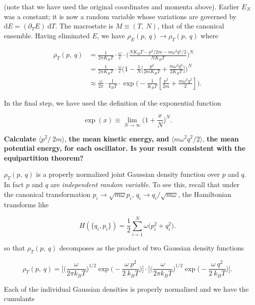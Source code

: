 \documentclass[11pt]{article}
\begin{document}
(note that we have used the original coordinates and momenta above). Earlier \(E_{N}\) was a constant; it is now a random variable whose variations are governed by \(\mathrm{d}E = (\partial_{T} E)~\mathrm{d} T\). The macrostate is \(M \equiv (T,~N)\), that of the canonical ensemble. Having eliminated \(E\), we have \(\rho_{E}(p,~q) \to \rho_{T}(p,~q)\) where

\begin{align*}
\rho_{T} (p,~q) & =\frac{1}{2 \pi K_{B} T} \cdot \frac{\omega}{e} \cdot\bigg(\frac{N K_{B} T-p^{2} / 2 m-m \omega^{2} q^{2} / 2}{N K_{B} T}\bigg)^{N} \\
& =\frac{1}{2 \pi K_{B} T} \cdot \frac{\omega}{e}\bigg(1-\frac{1}{N}\bigg[\frac{p^{2}}{2 m K_{B} T}+\frac{m \omega^{2} q^{2} }{2 K_{B} T}\bigg]\bigg)^{N} \\
& \approx \frac{\omega}{2 \pi} \cdot \frac{1}{k_{B} T} \cdot \exp \bigg(-\frac{1}{K_{B} T}\left[\frac{p^{2}}{2 m}+\frac{m \omega^{2} q^{2} }{2}\right]\bigg).
\end{align*}

In the final step, we have used the definition of the exponential function

\[
\exp(x) \equiv \lim_{N \to \infty} \bigg(1 + \frac{x}{N}\bigg)^{N}.
\]
\label{sec:org586be5a}

\textbf{Calculate} \(\langle p^{2} / ~ 2m \rangle\), \textbf{the mean kinetic energy, and} \(\langle m \omega^{2} q^{2} / 2 \rangle\), \textbf{the mean potential energy, for each oscillator. Is your result consistent with the equipartition theorem?}

\(\rho_{T} (p,~q)\) is a properly normalized joint Gaussian density function over \(p\) and \(q\). In fact \(p\) and \(q\) are \emph{independent random variable}. To see this, recall that under the canonical transformation \(p_i \rightarrow \sqrt{m\omega} p_i\), \(q_i \rightarrow q_i/ \sqrt{m\omega}\), the Hamiltonian transforms like

\[
H(\{q_i, p_i\}) = \frac{1}{2} \sum_{i=1}^{N} \omega \big( p_i^2 + q_i^2 \big).
\]

so that \(\rho_{T} (p,~q)\) decomposes as the product of two Gaussian density functions

\[
\rho_{T} (p,~q) = \bigg[\bigg(\frac{\omega}{2 \pi k_{B} T}\bigg)^{1/2} \exp \bigg(- \frac{\omega~p^{2}}{2~k_{B} T}\bigg) \bigg] \cdot \bigg[\bigg(\frac{\omega}{2 \pi k_{B} T}\bigg)^{1/2} \exp \bigg(- \frac{\omega~q^{2}}{2~k_{B} T}\bigg) \bigg].
\]

Each of the individual Gaussian densities is properly normalized and we have the cumulants
\end{document}
